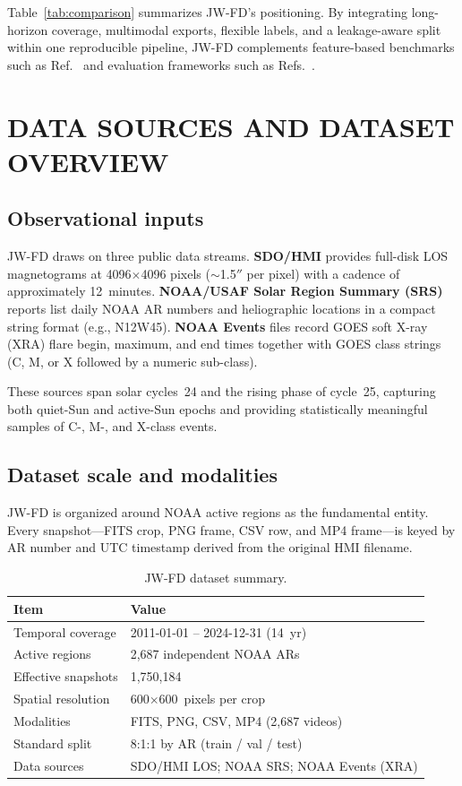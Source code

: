 \documentclass[]{spie}
\begin{document}
Table~\ref{tab:comparison} summarizes JW-FD's positioning. By integrating long-horizon coverage, multimodal exports, flexible labels, and a leakage-aware split within one reproducible pipeline, JW-FD complements feature-based benchmarks such as Ref.~ and evaluation frameworks such as Refs.~.

\section{DATA SOURCES AND DATASET OVERVIEW}
\label{sec:overview}

\subsection{Observational inputs}

JW-FD draws on three public data streams. \textbf{SDO/HMI}\cite{Scherrer2012,Pesnell2012} provides full-disk LOS magnetograms at 4096$\times$4096 pixels ($\sim$1.5$''$ per pixel) with a cadence of approximately 12~minutes. \textbf{NOAA/USAF Solar Region Summary (SRS)} reports list daily NOAA AR numbers and heliographic locations in a compact string format (e.g., N12W45).\cite{NOAA2024events} \textbf{NOAA Events} files record GOES soft X-ray (XRA) flare begin, maximum, and end times together with GOES class strings (C, M, or X followed by a numeric sub-class).

These sources span solar cycles~24 and the rising phase of cycle~25, capturing both quiet-Sun and active-Sun epochs and providing statistically meaningful samples of C-, M-, and X-class events.

\subsection{Dataset scale and modalities}

JW-FD is organized around NOAA active regions as the fundamental entity. Every snapshot---FITS crop, PNG frame, CSV row, and MP4 frame---is keyed by AR number and UTC timestamp derived from the original HMI filename.

\begin{table}[t]
\caption{JW-FD dataset summary.}
\label{tab:summary}
\centering
\small
\begin{tabular}{@{}ll@{}}
\toprule
Item & Value \\
\midrule
Temporal coverage & 2011-01-01 -- 2024-12-31 (14~yr) \\
Active regions & 2{,}687 independent NOAA ARs \\
Effective snapshots & 1{,}750{,}184 \\
Spatial resolution & 600$\times$600~pixels per crop \\
Modalities & FITS, PNG, CSV, MP4 (2{,}687 videos) \\
Standard split & 8:1:1 by AR (train / val / test) \\
Data sources & SDO/HMI LOS; NOAA SRS; NOAA Events (XRA) \\
\bottomrule
\end{tabular}
\end{table}
\end{document}
